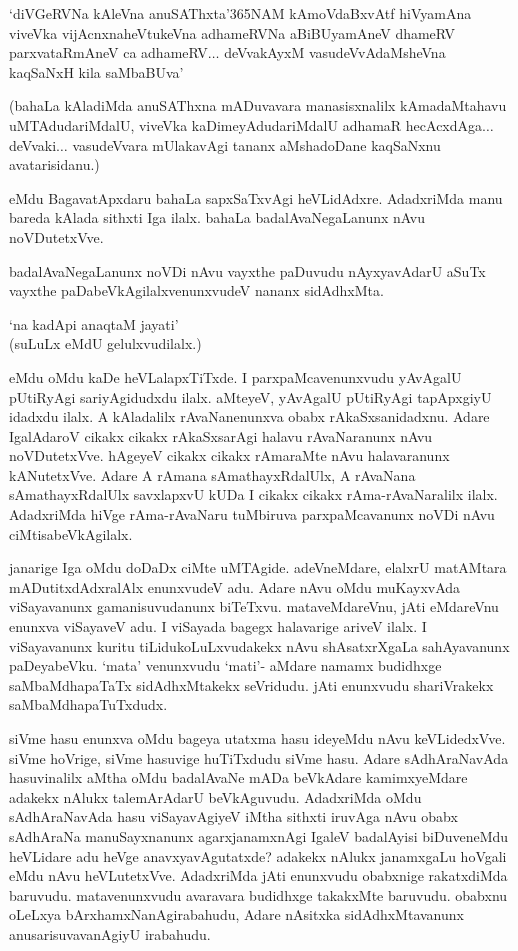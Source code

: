 \begin{shloka}
`diVGeRVNa kAleVna anuSAThxta\char'365NAM kAmoVdaBxvAtf hiVyamAna\\
viveVka vijAcnxnaheVtukeVna adhameRVNa aBiBUyamAneV dhameRV\\
parxvataRmAneV ca adhameRV$\ldots$ deVvakAyxM vasudeVvAdaMsheVna kaqSaNxH kila saMbaBUva'
\end{shloka}

(bahaLa kAladiMda anuSAThxna mADuvavara manasisxnalilx kAmadaMtahavu uMTAdudariMdalU, viveVka kaDimeyAdudariMdalU adhamaR hecAcxdAga$\ldots$ deVvaki$\ldots$ vasudeVvara mUlakavAgi tananx aMshadoDane kaqSaNxnu avatarisidanu.)

eMdu BagavatApxdaru bahaLa sapxSaTxvAgi heVLidAdxre. AdadxriMda manu bareda kAlada sithxti Iga ilalx. bahaLa badalAvaNegaLanunx nAvu noVDutetxVve.

badalAvaNegaLanunx noVDi nAvu vayxthe paDuvudu nAyxyavAdarU aSuTx vayxthe paDabeVkAgilalxvenunxvudeV nananx sidAdhxMta.

\begin{shloka}
`na kadApi anaqtaM jayati'\\
(suLuLx eMdU gelulxvudilalx.)
\end{shloka}

\noindent eMdu oMdu kaDe heVLalapxTiTxde. I parxpaMcavenunxvudu yAvAgalU pUtiRyAgi sariyAgidudxdu ilalx. aMteyeV, yAvAgalU pUtiRyAgi tapApxgiyU idadxdu ilalx. A kAladalilx rAvaNanenunxva obabx rAkaSxsanidadxnu. Adare IgalAdaroV cikakx cikakx rAkaSxsarAgi halavu rAvaNaranunx nAvu noVDutetxVve. hAgeyeV cikakx cikakx rAmaraMte nAvu halavaranunx kANutetxVve. Adare A rAmana sAmathayxRdalUlx, A rAvaNana sAmathayxRdalUlx savxlapxvU kUDa I cikakx cikakx rAma-rAvaNaralilx ilalx. AdadxriMda hiVge rAma-rAvaNaru tuMbiruva parxpaMcavanunx noVDi nAvu ciMtisabeVkAgilalx.

janarige Iga oMdu doDaDx ciMte uMTAgide. adeVneMdare, elalxrU matAMtara mADutitxdAdxralAlx enunxvudeV adu. Adare nAvu oMdu muKayxvAda viSayavanunx gamanisuvudanunx biTeTxvu. mataveMdareVnu, jAti eMdareVnu enunxva viSayaveV adu. I viSayada bagegx halavarige ariveV ilalx. I viSayavanunx kuritu tiLidukoLuLxvudakekx nAvu shAsatxrXgaLa sahAyavanunx paDeyabeVku. `mata' venunxvudu `mati'- aMdare namamx budidhxge saMbaMdhapaTaTx sidAdhxMtakekx seVridudu. jAti enunxvudu shariVrakekx saMbaMdhapaTuTxdudx.

siVme hasu enunxva oMdu bageya utatxma hasu ideyeMdu nAvu keVLidedxVve. siVme hoVrige, siVme hasuvige huTiTxdudu siVme hasu. Adare sAdhAraNavAda hasuvinalilx aMtha oMdu badalAvaNe mADa beVkAdare kamimxyeMdare adakekx nAlukx talemArAdarU beVkAguvudu. AdadxriMda oMdu sAdhAraNavAda hasu viSayavAgiyeV iMtha sithxti iruvAga nAvu obabx sAdhAraNa manuSayxnanunx agarxjanamxnAgi IgaleV badalAyisi biDuveneMdu heVLidare adu heVge anavxyavAgutatxde? adakekx nAlukx janamxgaLu hoVgali eMdu nAvu heVLutetxVve. AdadxriMda jAti enunxvudu obabxnige rakatxdiMda baruvudu. matavenunxvudu avaravara budidhxge takakxMte baruvudu. obabxnu oLeLxya bArxhamxNanAgirabahudu, Adare nAsitxka sidAdhxMtavanunx anusarisuvavanAgiyU irabahudu.

